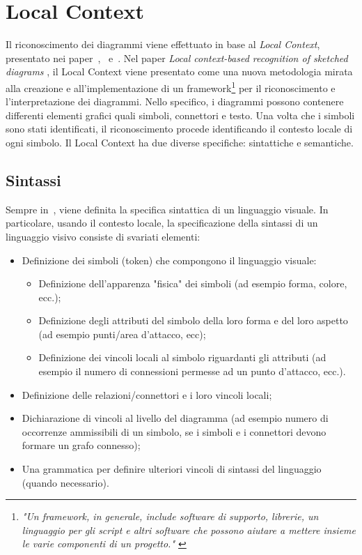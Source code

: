 ﻿\chapter{Local Context}\label{ch:localcontext}
    Il riconoscimento dei diagrammi viene effettuato in base al \textit{Local Context}, presentato nei paper~\cite{localcontext_recognition},~\cite{extending_localcontext} e~\cite{localcontext}.
    \newline
    Nel paper \textit{Local context-based recognition of sketched diagrams} \cite{localcontext_recognition}, il Local Context viene presentato come una nuova metodologia mirata alla creazione e all'implementazione di un framework\footnote{\textit{"Un framework, in generale, include software di supporto, librerie, un linguaggio per gli script e altri software che possono aiutare a mettere insieme le varie componenti di un progetto." \cite{framework}}} per il riconoscimento e l'interpretazione dei diagrammi. Nello specifico, i diagrammi possono contenere differenti elementi grafici quali simboli, connettori e testo. Una volta che i simboli sono stati identificati, il riconoscimento procede identificando il contesto locale di ogni simbolo.
    Il Local Context ha due diverse specifiche: sintattiche e semantiche.
    \section{Sintassi}
        Sempre in~\cite{localcontext_recognition}, viene definita la specifica sintattica di un linguaggio visuale.
        In particolare, usando il contesto locale, la specificazione della sintassi di un linguaggio visivo consiste di svariati elementi:
        \begin{itemize}
            \item Definizione dei simboli (token) che compongono il linguaggio visuale:
            \begin{itemize}
                \item Definizione dell'apparenza "fisica" dei simboli (ad esempio forma, colore, ecc.);
                \item Definizione degli attributi del simbolo della loro forma e del loro aspetto (ad esempio punti/area d'attacco, ecc);
                \item Definizione dei vincoli locali al simbolo riguardanti gli attributi (ad esempio il numero di connessioni permesse ad un punto d'attacco, ecc.).
            \end{itemize}
            \item Definizione delle relazioni/connettori e i loro vincoli locali;
            \item Dichiarazione di vincoli al livello del diagramma (ad esempio numero di occorrenze ammissibili di un simbolo, se i simboli e i connettori devono formare un grafo connesso);
            \item Una grammatica per definire ulteriori vincoli di sintassi del linguaggio (quando necessario).
        \end{itemize}

